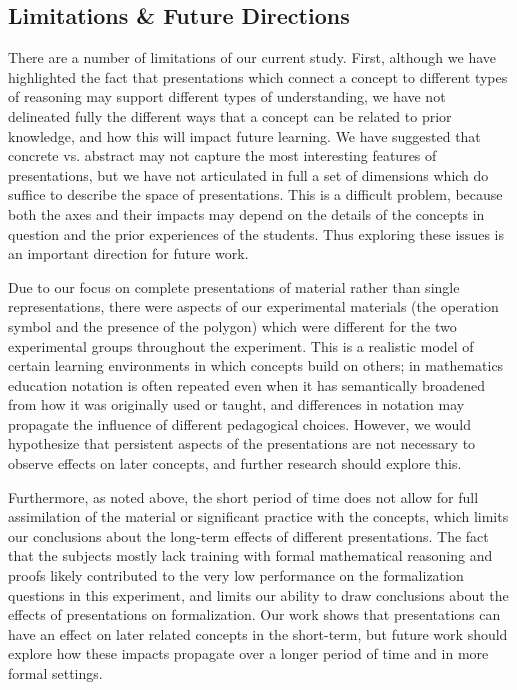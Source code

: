 \documentclass[man,10pt]{apa6}
\begin{document}
\subsection{Limitations \& Future Directions}
There are a number of limitations of our current study. First, although we have highlighted the fact that presentations which connect a concept to different types of reasoning may support different types of understanding, we have not delineated fully the different ways that a concept can be related to prior knowledge, and how this will impact future learning. We have suggested that concrete vs. abstract may not capture the most interesting features of presentations, but we have not articulated in full a set of dimensions which do suffice to describe the space of presentations. This is a difficult problem, because both the axes and their impacts may depend on the details of the concepts in question and the prior experiences of the students. Thus exploring these issues is an important direction for future work. \par 
Due to our focus on complete presentations of material rather than single representations, there were aspects of our experimental materials (the operation symbol and the presence of the polygon) which were different for the two experimental groups throughout the experiment. This is a realistic model of certain learning environments in which concepts build on others; in mathematics education notation is often repeated even when it has semantically broadened from how it was originally used or taught, and differences in notation may propagate the influence of different pedagogical choices. However, we would hypothesize that persistent aspects of the presentations are not necessary to observe effects on later concepts, and further research should explore this. \par
Furthermore, as noted above, the short period of time does not allow for full assimilation of the material or significant practice with the concepts, which limits our conclusions about the long-term effects of different presentations. The fact that the subjects mostly lack training with formal mathematical reasoning and proofs likely contributed to the very low performance on the formalization questions in this experiment, and limits our ability to draw conclusions about the effects of presentations on formalization. Our work shows that presentations can have an effect on later related concepts in the short-term, but future work should explore how these impacts propagate over a longer period of time and in more formal settings. \par
\end{document}
